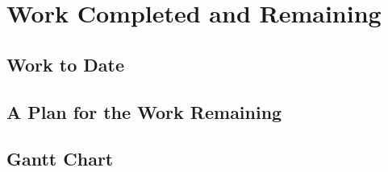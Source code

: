 \chapter{Work Completed and Remaining} \label{Chapter:four}

\section{Work to Date}

\section{A Plan for the Work Remaining}

\section{Gantt Chart}

